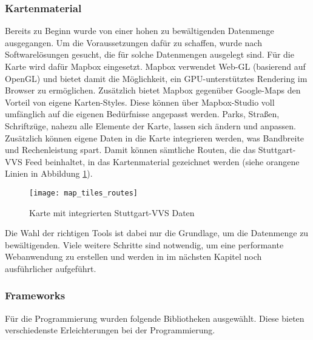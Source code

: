   \subsubsection{Kartenmaterial}
  \label{ssub:kartenmaterial}
    Bereits zu Beginn wurde von einer hohen zu bewältigenden Datenmenge ausgegangen. Um die Voraussetzungen dafür zu schaffen, wurde nach Softwarelösungen gesucht, die für solche Datenmengen ausgelegt sind. Für die Karte wird dafür Mapbox eingesetzt. Mapbox verwendet Web-GL (basierend auf OpenGL) und bietet damit die Möglichkeit, ein GPU-unterstütztes Rendering im Browser zu ermöglichen. Zusätzlich bietet Mapbox gegenüber Google-Maps den Vorteil von eigene Karten-Styles. Diese können über Mapbox-Studio voll umfänglich auf die eigenen Bedürfnisse angepasst werden. Parks, Straßen, Schriftzüge, nahezu alle Elemente der Karte, lassen sich ändern und anpassen. Zusätzlich können eigene Daten in die Karte integrieren werden, was Bandbreite und Rechenleistung spart. Damit können sämtliche Routen, die das Stuttgart-VVS Feed beinhaltet, in das Kartenmaterial gezeichnet werden (siehe orangene Linien in Abbildung \ref{fig:map_tiles_routes}).

    \begin{figure}[htbp]
      \begin{center}
        \texttt{[image: map\_tiles\_routes]}
        \caption{Karte mit integrierten Stuttgart-VVS Daten}
        \label{fig:map_tiles_routes}
      \end{center}
    \end{figure}
    
    Die Wahl der richtigen Tools ist dabei nur die Grundlage, um die Datenmenge zu bewältigenden. Viele weitere Schritte sind notwendig, um eine performante Webanwendung zu erstellen und werden in im nächsten Kapitel  noch ausführlicher aufgeführt.
    

  \subsubsection{Frameworks}
  \label{ssub:frameworks}
    Für die Programmierung wurden folgende Bibliotheken ausgewählt. Diese bieten verschiedenste Erleichterungen bei der Programmierung.

